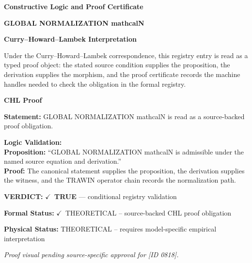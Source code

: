 \clearpage
\begingroup\tzpsupportsetup
\noindent\textbf{\fontsize{10.8pt}{12.8pt}\selectfont [ID 0818] Constructive Logic and Proof Certificate}\par
\noindent\textbf{\fontsize{10pt}{12pt}\selectfont GLOBAL NORMALIZATION mathcalN}\par
\vspace{0.45em}
\begingroup
\footnotesize
\setlength{\parskip}{0.22em}
\setlength{\parindent}{0pt}
\noindent\textbf{Curry--Howard--Lambek Interpretation}\par
Under the Curry--Howard--Lambek correspondence, this registry entry is read as a typed proof
object: the stated source condition supplies the proposition, the derivation supplies the
morphism, and the proof certificate records the machine handles needed to check the obligation
in the formal registry.

\vspace{0.45em}
\noindent\textbf{CHL Proof}\par
\textbf{Statement:} GLOBAL NORMALIZATION mathcalN is read as a source-backed proof obligation.

\textbf{Logic Validation:}\\
\textbf{Proposition:} ``GLOBAL NORMALIZATION mathcalN is admissible under the named source equation and derivation.''\\
\textbf{Proof:} The canonical statement supplies the proposition, the derivation supplies the witness, and the TRAWIN operator chain records the normalization path.

\textbf{VERDICT:} \ensuremath{\checkmark}\ \textbf{TRUE} --- conditional registry validation

\textbf{Formal Status:} \ensuremath{\checkmark}\ THEORETICAL -- source-backed CHL proof obligation

\textbf{Physical Status:} THEORETICAL -- requires model-specific empirical interpretation
\par\vspace{0.45em}
\par
\vfill
\begingroup\footnotesize\itshape
Proof visual pending source-specific approval for [ID 0818].
\par\endgroup
\vfill
\endgroup
\endgroup
